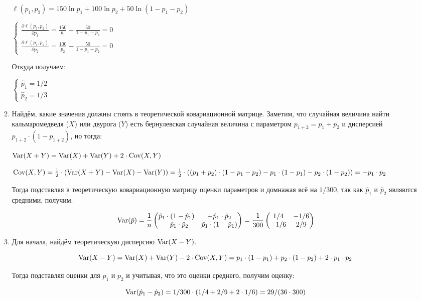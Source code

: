 \begin{enumerate}
\begin{enumerate}
$\ell(p_{1},p_{2}) = 150\ln p_{1} +100\ln p_{2}+50\ln (1-p_{1}-p_{2})$

$\begin{cases}
\frac{\partial \ell(p_{1},p_{2})}{\partial p_{1}}= \frac{150}{p_{1}} - \frac{50}{1-p_{1}-p_{2}}=0
\\
\frac{\partial \ell(p_{1},p_{2})}{\partial p_{2}}= \frac{100}{p_{2}} - \frac{50}{1-p_{1}-p_{2}}=0
\end{cases}$

Откуда получаем:

$\begin{cases}
\hat{p}_{1}=1/2
\\
\hat{p}_{2}=1/3
\end{cases}$
\item Найдём, какие значения должны стоять в теоретической ковариационной матрице.
Заметим, что случайная величина найти кальмаромедведя ($X$) или двурога ($Y$) есть бернулевская случайная величина с параметром $p_{1+2}=p_{1}+p_{2}$ и дисперсией $p_{1+2}\cdot(1-p_{1+2})$, но тогда:

$\operatorname{Var}(X + Y)=\operatorname{Var}(X)+\operatorname{Var}(Y)+2\cdot\operatorname{Cov}(X,Y)$

$\operatorname{Cov}(X,Y)=\frac{1}{2}\cdot(\operatorname{Var}(X+Y)-\operatorname{Var}(X)-\operatorname{Var}(Y))=\frac{1}{2}\cdot((p_{1}+p_{2})\cdot(1-p_{1}-p_{2})-p_{1}\cdot(1-p_{1})-p_{2}\cdot(1-p_{2}))=-p_{1}\cdot p_{2}$

Тогда подставляя в теоретическую ковариационную матрицу оценки параметров и домнажая всё на $1/300$, так как $\hat{p}_{1}$ и $\hat{p}_{2}$ являются средними, получим:

\[
\operatorname{Var}(\hat{p})=\frac{1}{n}\begin{pmatrix}
\hat{p}_{1}\cdot(1-\hat{p}_{1}) & -\hat{p}_{1}\cdot\hat{p}_{2}
\\
-\hat{p}_{1}\cdot\hat{p}_{2} & \hat{p}_{1}\cdot(1-\hat{p}_{1})
\end{pmatrix}=\frac{1}{300}\begin{pmatrix}
1/4 &-1/6
\\
-1/6 & 2/9
\end{pmatrix}
\]

\item Для начала, найдём теоретическую дисперсию $\operatorname{Var}(X-Y)$.

\[
\operatorname{Var}(X - Y)=\operatorname{Var}(X)+\operatorname{Var}(Y)-2\cdot\operatorname{Cov}(X,Y)=p_{1}\cdot(1-p_{1})+p_{2}\cdot(1-p_{2})+2\cdot p_{1}\cdot p_{2}
\]

Тогда подставляя оценки для $p_{1}$ и $p_{2}$ и учитывая, что это оценки среднего, получим оценку:

\[
\operatorname{Var}(\hat{p}_{1}-\hat{p}_{2})=1/300\cdot(1/4+2/9+2\cdot1/6)=29/(36\cdot300)
\]


\end{enumerate}
\end{enumerate}
